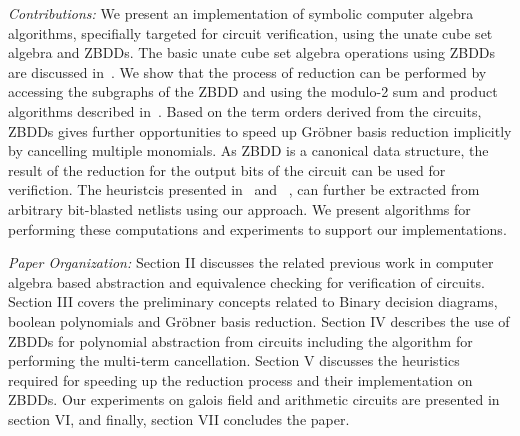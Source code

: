 \documentclass{article}
\begin{document}
\textit{Contributions:} We present an implementation of symbolic computer algebra algorithms, specifially targeted for circuit verification, using the unate cube set algebra and ZBDDs. The basic unate cube set algebra operations using ZBDDs are discussed in~\cite{minato:unatecube}. We show that the process of reduction can be performed by accessing the subgraphs of the ZBDD and using the modulo-2 sum and product algorithms described in~\cite{polybori}. Based on the term orders derived from the circuits, ZBDDs gives further opportunities to speed up Gr\"obner basis reduction implicitly by cancelling multiple monomials. As ZBDD is a canonical data structure, the result of the reduction for the output bits of the circuit can be used for verifiction. The heuristcis presented in~\cite{rolf:2016} and ~\cite{maciej:2015}, can further be extracted from arbitrary bit-blasted netlists using our approach. We present algorithms for performing these computations and experiments to support our implementations.
\par
\textit{Paper Organization:} Section II discusses the related previous work in computer algebra based abstraction and equivalence checking for verification of circuits. Section III covers the preliminary concepts related to Binary decision diagrams, boolean polynomials and Gr\"obner basis reduction. Section IV describes the use of ZBDDs for polynomial abstraction from circuits including the algorithm for performing the multi-term cancellation. Section V discusses the heuristics required for speeding up the reduction process and their implementation on ZBDDs. Our experiments on galois field and arithmetic circuits are presented in section VI, and finally, section VII concludes the paper.  
 

\end{document}
